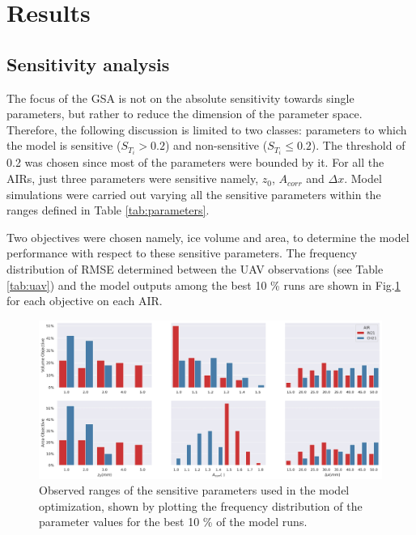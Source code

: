 \documentclass[utf8]{frontiersSCNS} %
\begin{document}
\section{Results}

\subsection{Sensitivity analysis}

The focus of the GSA is not on the absolute sensitivity towards single parameters, but rather to reduce the
dimension of the parameter space. Therefore, the following discussion is limited to two classes: parameters to
which the model is sensitive ($S_{T_{i}} > 0.2$) and non-sensitive ($S_{T_{i}} \leq 0.2$). The threshold of 0.2 was
chosen since most of the parameters were bounded by it. For all the AIRs, just three parameters were sensitive
namely, $z_{0}$, $A_{corr}$ and $\Delta x$. Model simulations were carried out varying all the sensitive parameters
within the ranges defined in Table \ref{tab:parameters}.

Two objectives were chosen namely, ice volume and area, to determine the model performance with respect to these
sensitive parameters. The frequency distribution  of RMSE determined between the UAV observations (see Table
\ref{tab:uav}) and the model outputs among the best 10 \% runs are shown in Fig.\ref{fig:param_hist} for each
objective on each AIR.

\begin{figure}
	\begin{center}
		\includegraphics[width=\linewidth]{Figures/param_hist.jpg}
	\end{center}
	\caption{Observed ranges of the sensitive parameters used in the model optimization, shown by
		plotting the frequency distribution of the parameter values for the best 10 \% of the model runs. }
	\label{fig:param_hist}
\end{figure}
\end{document}
